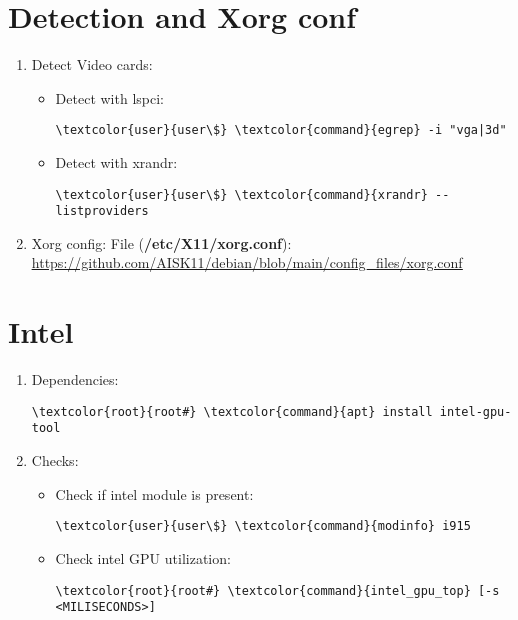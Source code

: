 \documentclass[10pt, a4paper, onecolumn, openany]{book} %
\begin{document}
\section{Detection and Xorg conf}
\begin{enumerate}
    \item Detect Video cards:
\begin{itemize}
    \item Detect with lspci:
\begin{Verbatim}[commandchars=\\\{\}]
\textcolor{user}{user\$} \textcolor{command}{egrep} -i "vga|3d"
\end{Verbatim}
    \item Detect with xrandr:
\begin{Verbatim}[commandchars=\\\{\}]
\textcolor{user}{user\$} \textcolor{command}{xrandr} --listproviders
\end{Verbatim}
\end{itemize}
    \item Xorg config:
\newline File (\textbf{\textcolor{file}{/etc/X11/xorg.conf}}):
\newline \underline{\url{https://github.com/AISK11/debian/blob/main/config_files/xorg.conf}}
\end{enumerate}
\section{Intel}
\begin{enumerate}
    \item Dependencies:
\begin{Verbatim}[commandchars=\\\{\}]
\textcolor{root}{root#} \textcolor{command}{apt} install intel-gpu-tool
\end{Verbatim}
    \item Checks:
\begin{itemize}
    \item Check if intel module is present:
\begin{Verbatim}[commandchars=\\\{\}]
\textcolor{user}{user\$} \textcolor{command}{modinfo} i915
\end{Verbatim}
    \item Check intel GPU utilization:
\begin{Verbatim}[commandchars=\\\{\}]
\textcolor{root}{root#} \textcolor{command}{intel_gpu_top} [-s <MILISECONDS>]
\end{Verbatim}
\end{itemize}
\end{enumerate}
\end{document}
